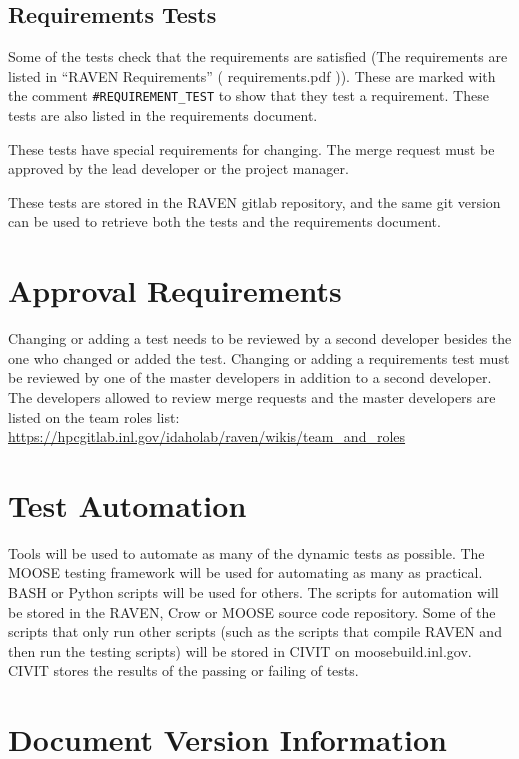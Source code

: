 \documentclass{article}
\begin{document}
\subsection{Requirements Tests}

Some of the tests check that the requirements are satisfied (The
requirements are listed in ``RAVEN Requirements'' ( requirements.pdf
)).  These are marked with the comment \verb'#REQUIREMENT_TEST' to show
that they test a requirement.  These tests are also listed in the
requirements document.

These tests have special requirements for changing.  The merge request
must be approved by the lead developer or the project manager.

These tests are stored in the RAVEN gitlab repository, and the same
git version can be used to retrieve both the tests and the
requirements document.

\section{Approval Requirements}

Changing or adding a test needs to be reviewed by a second developer
besides the one who changed or added the test.  Changing or adding a
requirements test must be reviewed by one of the master developers in
addition to a second developer.  The developers allowed to review
merge requests and the master developers are listed on the team roles
list:
\url{https://hpcgitlab.inl.gov/idaholab/raven/wikis/team_and_roles}



\section{Test Automation}

Tools will be used to automate as many of the dynamic tests as
possible.  The MOOSE testing framework will be used for automating as
many as practical.  BASH or Python scripts will be used for others.
The scripts for automation will be stored in the RAVEN, Crow or MOOSE
source code repository.  Some of the scripts that only run other
scripts (such as the scripts that compile RAVEN and then run the
testing scripts) will be stored in CIVIT on moosebuild.inl.gov.  CIVIT
stores the results of the passing or failing of tests.

\section*{Document Version Information}


\end{document}
